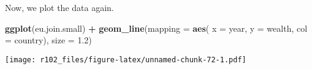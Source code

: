 \documentclass[]{article}
\newenvironment{Shaded}{\begin{snugshade}}{\end{snugshade}}
\newcommand{\DataTypeTok}[1]{\textcolor[rgb]{0.13,0.29,0.53}{#1}}
\newcommand{\FloatTok}[1]{\textcolor[rgb]{0.00,0.00,0.81}{#1}}
\newcommand{\KeywordTok}[1]{\textcolor[rgb]{0.13,0.29,0.53}{\textbf{#1}}}
\newcommand{\NormalTok}[1]{#1}
\newcommand{\OperatorTok}[1]{\textcolor[rgb]{0.81,0.36,0.00}{\textbf{#1}}}
\newcommand{\StringTok}[1]{\textcolor[rgb]{0.31,0.60,0.02}{#1}}
\begin{document}
Now, we plot the data again.

\begin{Shaded}
\begin{Highlighting}[]
\KeywordTok{ggplot}\NormalTok{(eu.join.small) }\OperatorTok{+}
\StringTok{    }\KeywordTok{geom_line}\NormalTok{(}\DataTypeTok{mapping =} \KeywordTok{aes}\NormalTok{( }\DataTypeTok{x =}\NormalTok{ year, }\DataTypeTok{y =}\NormalTok{ wealth, }\DataTypeTok{col =}\NormalTok{ country), }\DataTypeTok{size =} \FloatTok{1.2}\NormalTok{)}
\end{Highlighting}
\end{Shaded}

\texttt{[image: r102\_files/figure-latex/unnamed-chunk-72-1.pdf]}
\end{document}
